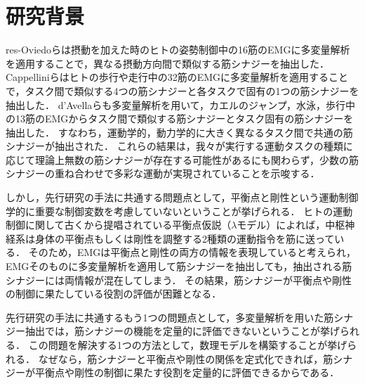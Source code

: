 \section{研究背景}
res-Oviedoらは摂動を加えた時のヒトの姿勢制御中の16筋のEMGに多変量解析を適用することで，異なる摂動方向間で類似する筋シナジーを抽出した\cite{Torres-Oviedo2007}．
Cappelliniらはヒトの歩行や走行中の32筋のEMGに多変量解析を適用することで，タスク間で類似する4つの筋シナジーと各タスクで固有の1つの筋シナジーを抽出した\cite{Cappellini2006}．
d'Avellaらも多変量解析を用いて，カエルのジャンプ，水泳，歩行中の13筋のEMGからタスク間で類似する筋シナジーとタスク固有の筋シナジーを抽出した\cite{d'Avella2005}．
すなわち，運動学的，動力学的に大きく異なるタスク間で共通の筋シナジーが抽出された．
これらの結果は，我々が実行する運動タスクの種類に応じて理論上無数の筋シナジーが存在する可能性があるにも関わらず，少数の筋シナジーの重ね合わせで多彩な運動が実現されていることを示唆する．

しかし，先行研究の手法に共通する問題点として，平衡点と剛性という運動制御学的に重要な制御変数を考慮していないということが挙げられる．
ヒトの運動制御に関して古くから提唱されている平衡点仮説（$\lambda$モデル）によれば，中枢神経系は身体の平衡点もしくは剛性を調整する2種類の運動指令を筋に送っている\cite{Feldman2008}．
そのため，EMGは平衡点と剛性の両方の情報を表現していると考えられ，EMGそのものに多変量解析を適用して筋シナジーを抽出しても，抽出される筋シナジーには両情報が混在してしまう．
その結果，筋シナジーが平衡点や剛性の制御に果たしている役割の評価が困難となる．

先行研究の手法に共通するもう1つの問題点として，多変量解析を用いた筋シナジー抽出では，筋シナジーの機能を定量的に評価できないということが挙げられる．
この問題を解決する1つの方法として，数理モデルを構築することが挙げられる．
なぜなら，筋シナジーと平衡点や剛性の関係を定式化できれば，筋シナジーが平衡点や剛性の制御に果たす役割を定量的に評価できるからである．


